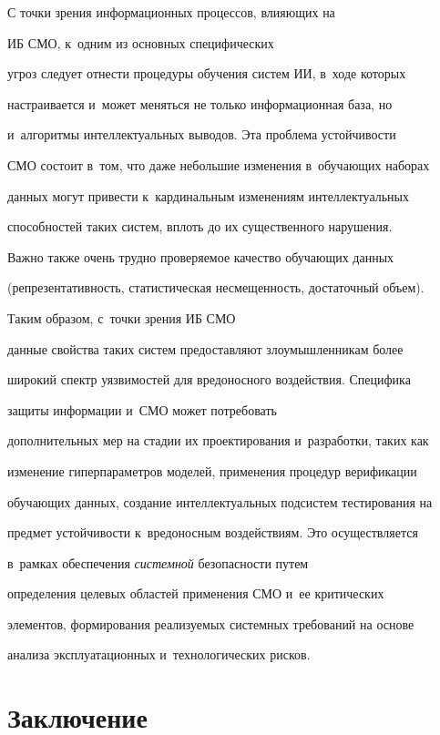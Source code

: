      

     С точки зрения информационных процессов, влияющих на 

ИБ СМО, к~одним из основных специфических 

угроз следует отнести процедуры обучения систем ИИ, в~ходе которых 

настраивается и~может меняться не только информационная база, но 

и~алгоритмы интеллектуальных выводов. Эта проб\-ле\-ма устой\-чи\-вости 

СМО состоит в~том, что даже небольшие изменения в~обучающих наборах 

данных могут привести к~кардинальным изменениям интеллектуальных 

способностей таких сис\-тем, вплоть до их существенного нарушения. 

Важно также очень трудно проверяемое качество обуча\-ющих данных 

(репрезентативность, статистическая несмещенность, достаточный объем).

     

     Таким образом, с~точки зрения ИБ СМО 

данные свойства таких систем предоставляют злоумышленникам более 

широкий спектр уязвимостей для вредоносного воздействия. Специфика 

защиты информации и~СМО может потребовать 

дополнительных мер на стадии их проектирования и~разработки, таких как 

изменение гиперпараметров моделей, применения процедур верификации 

обучающих данных, создание интеллектуальных подсистем тестирования на 

предмет устойчивости к~вредоносным воздействиям. Это осуществляется 

в~рамках обеспечения \textit{сис\-тем\-ной} безопас\-ности путем 

определения целевых областей применения СМО и~ее критических 

элементов, формирования реализуемых системных требований на основе 

анализа эксплуатационных и~технологических рисков.



     

\section{Заключение}



